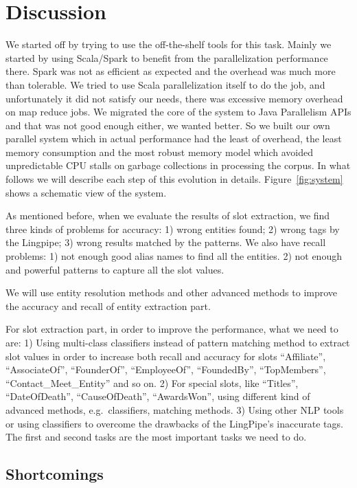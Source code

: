 

\section{Discussion}

 We started 
off by trying to use the off-the-shelf tools for this task. Mainly we started 
by using Scala/Spark\cite{ferc11} to benefit from the parallelization 
performance there.  Spark was not as efficient as expected and the overhead 
was much more than tolerable. We tried to use Scala parallelization itself to 
do the job, and unfortunately it did not satisfy our needs, there was 
excessive memory overhead on map reduce jobs. We migrated the core of the 
system to Java Parallelism APIs and that was not good enough either, we wanted 
better. So we built our own parallel system which in actual performance had 
the least of overhead, the least memory consumption and the most robust memory 
model which avoided unpredictable CPU stalls on garbage collections in 
processing the corpus. In what follows we will describe each step of this 
evolution in details. Figure~\ref{fig:system} shows a schematic view of the 
system. 

As mentioned before, when we evaluate the results of slot extraction, we find 
three kinds of problems for accuracy: 1) wrong entities found; 2) wrong tags 
by the Lingpipe; 3) wrong results matched by the patterns.  We also have 
recall problems: 1) not enough good alias names to find all the entities. 2) 
not enough and powerful patterns to capture all the slot values. 

We will use entity resolution methods and other advanced methods to improve 
the accuracy and recall of entity extraction part. 

For slot extraction part, in order to improve the performance, what we need to 
are: 1) Using multi-class classifiers instead of pattern matching method to 
extract slot values in order to increase both recall and accuracy for slots
``Affiliate'', ``AssociateOf'', ``FounderOf'', ``EmployeeOf'', ``FoundedBy'',
``TopMembers'', ``Contact\_Meet\_Entity'' and so on. 2) For special slots, 
like ``Titles'', ``DateOfDeath'', ``CauseOfDeath'', ``AwardsWon'', using different 
kind of advanced methods, e.g.\ classifiers, matching methods. 3) Using other 
NLP tools or using classifiers to overcome the drawbacks of the LingPipe’s 
inaccurate tags. The first and second tasks are the most important tasks we 
need to do.

\subsection{Shortcomings}

